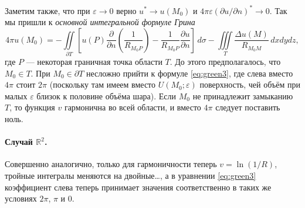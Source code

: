 Заметим также, что при $ \varepsilon \to 0 $ верно $ u^\ast \to u(M_0) $ и $
4\pi\varepsilon (\partial u/\partial n)^\ast \to 0 $. Так мы пришли к
\emph{основной интегральной формуле Грина} 
\begin{equation}\label{eq:green3}
  4\pi u(M_0) = - \iint\limits_{\partial T} \left[ u(P) \frac{\partial}{\partial
  n} \left( \frac{1}{R_{M_0 P}} \right)  - \frac{1}{R_{M_0 P}}\frac{\partial
u}{\partial n} \right] \,d\sigma - \iiint\limits_T \frac{\Delta
u(M)}{R_{M_0M}}\,dxdydz,
\end{equation}
где $ P $ --- некоторая граничная точка области $ T $. До этого предполагалось,
что $ M_0 \in T $. При $ M_0 \in \partial T$ несложно прийти к формуле
\eqref{eq:green3}, где слева вместо $ 4\pi $ стоит $ 2\pi $ (поскольку там имеем
вместо $ U(M_0; \varepsilon) $ поверхность, чей объём при малых $ \varepsilon $
близок к половине объёма шара). Если $ M_0 $ не
принадлежит замыканию $ T $, то функция $ v $ гармонична во всей области, и
вместо $ 4\pi $ следует поставить ноль.

\paragraph{Случай $ \mathbb R^2 $.}
Совершенно аналогично, только для гармоничности теперь $ v = \ln(1/R) $, тройные
интегралы меняются на двойные\ldots, а в уравнении \eqref{eq:green3} коэффициент
слева теперь принимает значения соответственно в таких же условиях $ 2\pi $, $ \pi $ и 0.

